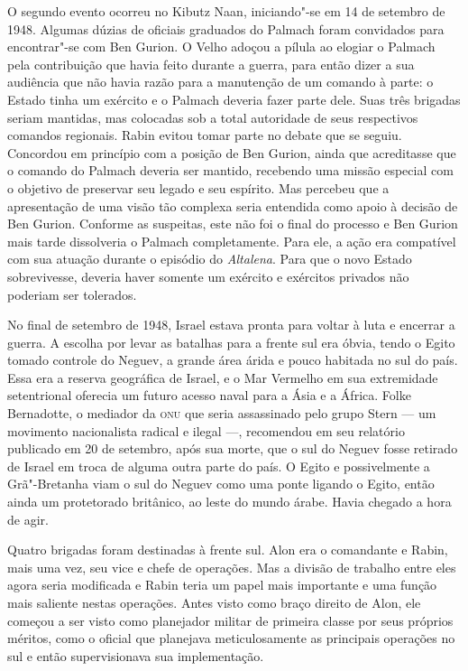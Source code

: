 O segundo evento ocorreu no Kibutz Naan, iniciando"-se em 14 de setembro
de 1948. Algumas dúzias de oficiais graduados do Palmach foram
convidados para encontrar"-se com Ben Gurion. O Velho adoçou a pílula ao
elogiar o Palmach pela contribuição que havia feito durante a guerra,
para então dizer a sua audiência que não havia razão para a manutenção
de um comando à parte: o Estado tinha um exército e o Palmach deveria
fazer parte dele. Suas três brigadas seriam mantidas, mas colocadas sob
a total autoridade de seus respectivos comandos regionais. Rabin evitou
tomar parte no debate que se seguiu. Concordou em princípio com a
posição de Ben Gurion, ainda que acreditasse que o comando do Palmach
deveria ser mantido, recebendo uma missão especial com o objetivo de
preservar seu legado e seu espírito. Mas percebeu que a apresentação de
uma visão tão complexa seria entendida como apoio à decisão de Ben
Gurion. Conforme as suspeitas, este não foi o final do processo e Ben
Gurion mais tarde dissolveria o Palmach completamente. Para ele, a ação
era compatível com sua atuação durante o episódio do \textit{Altalena}.
Para que o novo Estado sobrevivesse, deveria haver somente um exército e
exércitos privados não poderiam ser tolerados.

No final de setembro de 1948, Israel estava pronta para voltar à luta e
encerrar a guerra. A escolha por levar as batalhas para a frente sul era
óbvia, tendo o Egito tomado controle do Neguev, a grande área árida e
pouco habitada no sul do país. Essa era a reserva geográfica de Israel, e
o Mar Vermelho em sua extremidade setentrional oferecia um futuro acesso
naval para a Ásia e a África. Folke Bernadotte, o mediador da \textsc{onu} que
seria assassinado pelo grupo Stern --- um movimento nacionalista radical e
ilegal ---, recomendou em seu relatório publicado em 20 de setembro, após
sua morte, que o sul do Neguev fosse retirado de Israel em troca de
alguma outra parte do país. O Egito e possivelmente a Grã"-Bretanha viam
o sul do Neguev como uma ponte ligando o Egito, então ainda um
protetorado britânico, ao leste do mundo árabe. Havia chegado a hora de
agir.

Quatro brigadas foram destinadas à frente sul. Alon era o comandante e
Rabin, mais uma vez, seu vice e chefe de operações. Mas a divisão de
trabalho entre eles agora seria modificada e Rabin teria um papel mais
importante e uma função mais saliente nestas operações. Antes visto como
braço direito de Alon, ele começou a ser visto como planejador militar
de primeira classe por seus próprios méritos, como o oficial que planejava
meticulosamente as principais operações no sul e então supervisionava
sua implementação.

